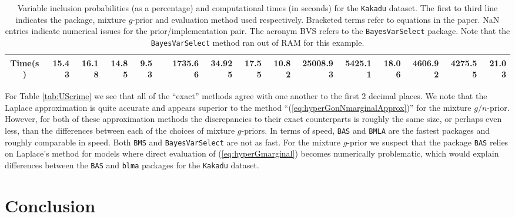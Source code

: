 \begin{sidewaystable}[h!]
\begin{center}
{\begin{tabular}{c|r|r|rrrrrr|rrrr|rrr}
				Time(s) & 15.43 & 16.18 & 14.85  &  9.53   &       & 1735.66  & 34.925  &   17.55 &  10.82         &  25008.93 & 
				5425.11  &   18.06   & 4606.92       &  4275.55  & 21.03  \\ 
				\hline
			\end{tabular}
		}
	\end{center}\bigskip
    \caption{Variable inclusion probabilities (as a percentage) and
        computational times (in seconds) for the {\tt Kakadu} dataset.  The
        first to third line indicates the package, mixture $g$-prior and
        evaluation method used respectively. Bracketed terms refer to equations
    in the paper. NaN entries indicate numerical issues for the
prior/implementation pair. The acronym BVS refers to the {\tt BayesVarSelect}
package. Note that the {\tt BayesVarSelect} method ran out of RAM for this
example.}
	\label{tab:Kakadu}
\end{sidewaystable}


For Table \ref{tab:UScrime} we see that all of the ``exact'' methods agree with
one another to the first 2 decimal places. We note that the Laplace
approximation is quite accurate and appears superior to  the method
``(\ref{eq:hyperGonNmarginalApprox})'' for the mixture $g/n$-prior. However,
for both of these approximation methods the discrepancies to their exact
counterparts is roughly the same size, or perhaps even less, than the
differences between each of the choices of mixture $g$-priors. In terms of
speed, {\tt BAS} and {\tt BMLA} are the fastest packages and roughly comparable
in speed. Both {\tt BMS} and {\tt BayesVarSelect} are not as fast.  For the
mixture $g$-prior we suspect that the package {\tt BAS} relies on Laplace's
method for models where direct evaluation of (\ref{eq:hyperGmarginal}) becomes
numerically problematic, which would explain differences between the {\tt BAS}
and {\tt blma} packages for the {\tt Kakadu} dataset.

\section{Conclusion}
\label{sec:chapter_3_conclusion}

